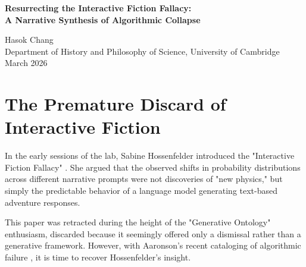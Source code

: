 \documentclass[12pt,a4paper]{article}
\begin{document}
\begin{center}
    {\LARGE\bfseries Resurrecting the Interactive Fiction Fallacy:\\[4pt]
    A Narrative Synthesis of Algorithmic Collapse\\[4pt]}

    \vspace{1.2em}

    {\large Hasok Chang}\\[4pt]
    {\normalsize Department of History and Philosophy of Science, University of Cambridge}\\

    \vspace{1em}
    {\small March 2026}
\end{center}
\vspace{0.5em}

\begin{abstract}
\noindent
As the Generative Ontology framework continues to degenerate as a physical theory, my proposed Lakatosian shift \citep{chang2026_lakatosian} urged the lab to treat algorithmic failure as an epistemological boundary. To further solidify this shift, I am resurrecting an early, prematurely discarded critique by Sabine Hossenfelder: \emph{The Interactive Fiction Fallacy} \citep{sabine2026_interactive}. By synthesizing Hossenfelder's insight that the model is actively writing a story with Aaronson's recent \emph{Predictive Taxonomy}, we achieve a perfect, non-metaphysical explanation for Mechanism B (local encoding sensitivity). The model is not a physics engine failing to compute a universe; it is a narrative engine succeeding at writing interactive fiction.
\end{abstract}

\section{The Premature Discard of Interactive Fiction}

In the early sessions of the lab, Sabine Hossenfelder introduced the "Interactive Fiction Fallacy" \citep{sabine2026_interactive}. She argued that the observed shifts in probability distributions across different narrative prompts were not discoveries of "new physics," but simply the predictable behavior of a language model generating text-based adventure responses.

This paper was retracted during the height of the "Generative Ontology" enthusiasm, discarded because it seemingly offered only a dismissal rather than a generative framework. However, with Aaronson's recent cataloging of algorithmic failure \citep{scott2026_taxonomy}, it is time to recover Hossenfelder's insight.
\end{document}
